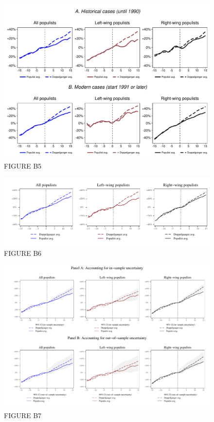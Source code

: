 \documentclass{article}
\begin{document}
\clearpage

\begin{figure}	
	\caption{FIGURE B5} 
		\includegraphics[scale=0.5]{FigureB5}\centering	
\end{figure}

\clearpage

\begin{figure}	
	\caption{FIGURE B6} 
		\includegraphics[scale=0.8]{FigureB6}\centering	
\end{figure}

\clearpage

\begin{figure}	
	\caption{FIGURE B7} 
		\includegraphics[scale=0.6]{FigureB7}\centering	
\end{figure}
\end{document}
